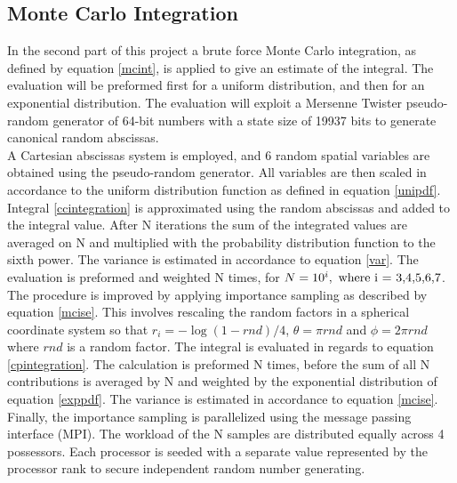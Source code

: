 \documentclass[%
reprint,
amsmath,amssymb,
aps,
]{revtex4-1}
\begin{document}
\subsection{Monte Carlo Integration}
In the second part of this project a brute force Monte Carlo integration, as defined by equation \ref{mcint}, is applied to give an estimate of the integral. The evaluation will be preformed first for a uniform distribution, and then for an exponential distribution. The evaluation will exploit a Mersenne Twister pseudo-random generator of 64-bit numbers with a state size of 19937 bits to generate canonical random abscissas. \\ \indent A Cartesian abscissas system is employed, and 6 random spatial variables are obtained using the pseudo-random generator. All  variables are then scaled in accordance to the uniform distribution function as defined in equation \ref{unipdf}. Integral \ref{ccintegration} is approximated using the random abscissas and added to the integral value. After N iterations the sum of the integrated values are averaged on N and multiplied with the probability distribution function to the sixth power. The variance is estimated in accordance to equation \ref{var}. The evaluation is preformed and weighted N times, for $N=10^i, \textnormal{ where i = 3,4,5,6,7}$.\\ \indent 
The procedure is improved by applying importance sampling as described by equation \ref{mcise}. This involves rescaling the random factors in a spherical coordinate system so that $r_i = -\log(1-rnd)/4$, $\theta = \pi rnd$ and $\phi = 2\pi rnd$ where $rnd$ is a random factor. The integral is evaluated in regards to equation \ref{cpintegration}. The calculation is preformed N times, before the sum of all N contributions is averaged by N and weighted by the exponential distribution of equation  \ref{exppdf}. The variance is estimated in accordance to equation \ref{mcise}. \\ \indent 
Finally, the importance sampling is parallelized using the message passing interface (MPI). The workload of the N samples are distributed equally across 4 possessors. Each processor is seeded with a separate value represented by the processor rank to secure independent random number generating.
\end{document}
